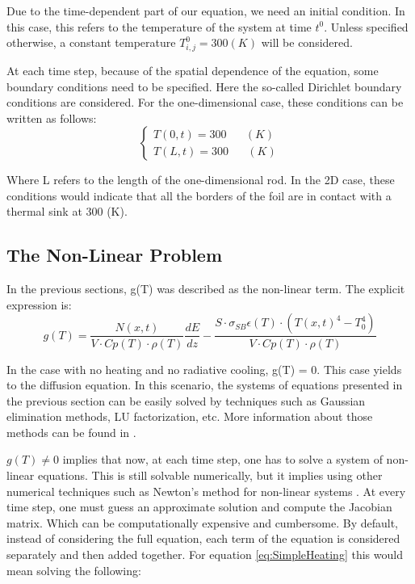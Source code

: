 Due to the time-dependent part of our equation, we need an initial condition. In this case, this refers to the temperature of the system at time $t^0$. Unless specified otherwise, a constant temperature $T_{i,j}^0 = 300 (K)$ will be considered.

At each time step, because of the spatial dependence of the equation, some boundary conditions need to be specified. Here the so-called Dirichlet boundary conditions are considered. For the one-dimensional case, these conditions can be written as follows: 
\begin{equation}
    \begin{cases}
      T(0,t) = 300 \mspace{30mu} (K) \\
      T(L,t) = 300 \mspace{30mu} (K) 
    \end{cases}
\end{equation}

Where L refers to the length of the one-dimensional rod. In the 2D case, these conditions would indicate that all the borders of the foil are in contact with a thermal sink at 300 (K). 

\subsection{The Non-Linear Problem}

In the previous sections, g(T) was described as the non-linear term. The explicit expression is: 
\begin{equation}
    g(T) = \frac{N(x,t)}{V\cdot Cp(T)\cdot \rho(T)}\frac{dE}{dz} - \frac{S\cdot \sigma_{SB}\epsilon(T)\cdot \left( T(x,t)^4 - T_0^4\right)}{V\cdot Cp(T)\cdot \rho(T)}
\end{equation}

In the case with no heating and no radiative cooling, g(T) = 0. This case yields to the diffusion equation. In this scenario, the systems of equations presented in the previous section can be easily solved by techniques such as Gaussian elimination methods, LU factorization, etc. More information about those methods can be found in \parencite[][]{ref:AlvaroBook}. 

$g(T) \neq 0$ implies that now, at each time step, one has to solve a system of non-linear equations. This is still solvable numerically, but it implies using other numerical techniques such as Newton's method for non-linear systems \parencite[][]{ref:AlvaroBook}. At every time step, one must guess an approximate solution and compute the Jacobian matrix. Which can be computationally expensive and cumbersome. By default, instead of considering the full equation, each term of the equation is considered separately and then added together. For equation \ref{eq:SimpleHeating} this would mean solving the following: 


